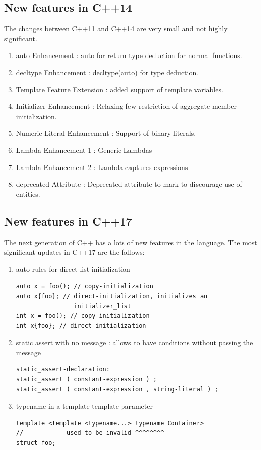 \documentclass[12pt]{article}
\begin{document}
\subsection{New features in C++14}
{\setlength{\parindent}{0cm}
The changes between C++11 and C++14 are very small and not highly significant.\\
\begin{enumerate}
\item auto Enhancement : auto for return type deduction for normal functions. 
\item decltype Enhancement : decltype(auto) for type deduction.
\item Template Feature Extension : added support of template variables.
\item Initializer Enhancement : Relaxing few restriction of aggregate member initialization.
\item Numeric Literal Enhancement : Support of binary literals.
\item Lambda Enhancement 1 : Generic Lambdas
\item Lambda Enhancement 2 : Lambda captures expressions
\item deprecated Attribute : Deprecated attribute to mark to discourage use of entities.\cite{Sahoo}
\end{enumerate}

\subsection{New features in C++17}
The next generation of C++ has a lots of new features in the language. The most significant updates in C++17 are the follows:\cite{Bartek}\\
\begin{enumerate}
\item auto rules for direct-list-initialization
\begin{lstlisting}
auto x = foo(); // copy-initialization
auto x{foo}; // direct-initialization, initializes an 
				initializer_list
int x = foo(); // copy-initialization
int x{foo}; // direct-initialization
\end{lstlisting}
\item static assert with no message : allows to have conditions without passing the message
\begin{lstlisting}
static_assert-declaration:
static_assert ( constant-expression ) ;
static_assert ( constant-expression , string-literal ) ;
\end{lstlisting}
\item typename in a template template parameter
\begin{lstlisting}
template <template <typename...> typename Container>
//            used to be invalid ^^^^^^^^
struct foo;


\end{lstlisting}
\end{enumerate}}
\end{document}
